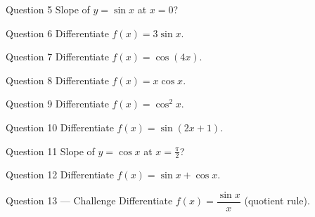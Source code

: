 \documentclass[11pt]{article}
\begin{document}
\begin{qbox}{Question 5}
Slope of $y=\sin x$ at $x=0$?\workspace{2.4cm}
\end{qbox}

\begin{qbox}{Question 6}
Differentiate $f(x)=3\sin x$.\workspace{2.4cm}
\end{qbox}

\begin{qbox}{Question 7}
Differentiate $f(x)=\cos(4x)$.\workspace{2.4cm}
\end{qbox}

\begin{qbox}{Question 8}
Differentiate $f(x)=x\cos x$.\workspace{2.4cm}
\end{qbox}

\begin{qbox}{Question 9}
Differentiate $f(x)=\cos^2 x$.\workspace{2.4cm}
\end{qbox}

\begin{qbox}{Question 10}
Differentiate $f(x)=\sin(2x+1)$.\workspace{2.4cm}
\end{qbox}

\begin{qbox}{Question 11}
Slope of $y=\cos x$ at $x=\tfrac{\pi}{2}$?\workspace{2.4cm}
\end{qbox}

\begin{qbox}{Question 12}
Differentiate $f(x)=\sin x+\cos x$.\workspace{2.4cm}
\end{qbox}

\begin{qbox}{Question 13 --- Challenge}
Differentiate $f(x)=\dfrac{\sin x}{x}$ (quotient rule).\workspace{3cm}
\end{qbox}

\clearpage
{}
\end{document}
